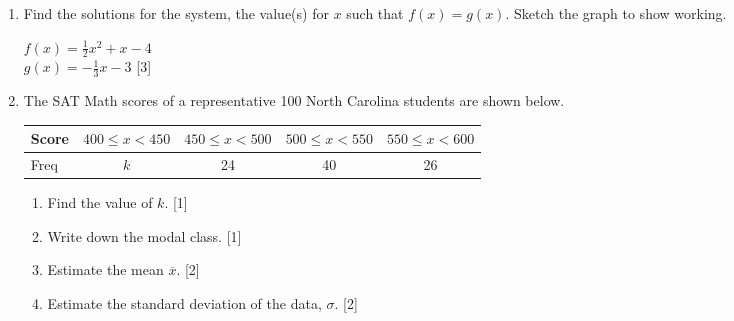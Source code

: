 \documentclass[12pt, twoside]{article}
\begin{document}
\begin{enumerate}
  \newpage
    \item Find the solutions for the system, the value(s) for $x$ such that $f(x)=g(x)$. Sketch the graph to show working.
    \begin{multicols}{2}
        \qquad $f(x)=\frac{1}{2}x^2+x-4$ \\[0.25cm] $g(x)=-\frac{1}{3}x-3$ \hfill [3] \vspace{0.3cm}
    \end{multicols}

    \item The SAT Math scores of a representative 100 North Carolina students are shown below.
        \begin{center}
            \begin{tabular}{|l|c|c|c|c|}
                \hline
                Score & $400 \leq x < 450$ & $450 \leq x < 500$ & $500 \leq x < 550$ & $550 \leq x < 600$\\ 
                \hline 
                Freq & $k$ & 24 & 40 & 26\\ 
                \hline 
                \end{tabular}
        \end{center}
        \begin{enumerate}
            \item Find the value of $k$.  \hfill [1]
            \item Write down the modal class. \hfill [1]
            \item Estimate the mean $\overline{x}$. \hfill [2]
            \item Estimate the standard deviation of the data, $\sigma$.  \hfill [2]
            \end{enumerate}

        
                   
\end{enumerate}
\end{document}
